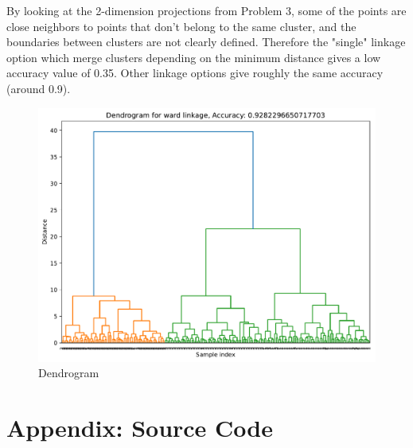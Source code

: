 \documentclass[a4paper]{article}
\begin{document}
By looking at the 2-dimension projections from Problem 3, some of the points are close neighbors to points that don't belong to the same cluster, and the boundaries between clusters are not clearly defined.
Therefore the "single" linkage option which merge clusters depending on the minimum distance gives a low accuracy value of 0.35.
Other linkage options give roughly the same accuracy (around 0.9).

\begin{figure}[H]
  \begin{center}
    \includegraphics[width=\textwidth]{ola/dendrogram.pdf}
    \caption{Dendrogram}
    \label{fig:dendrogram}
  \end{center}
\end{figure}

\newpage


\printbibliography

\section*{Appendix: Source Code}




\end{document}
